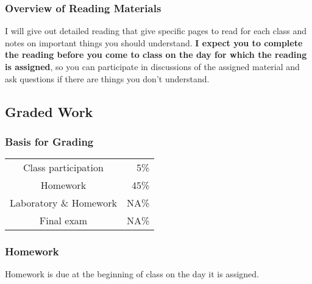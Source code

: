 \documentclass[11pt,twoside]{jgsyllabus}\usepackage[]{graphicx}\usepackage[]{xcolor}
\begin{document}
\subsubsection{Overview of Reading Materials}
I will give out detailed reading that give specific pages to read for each
class and notes on important things you should understand.
\textbf{I expect you to complete the reading before you come to class
on the day for which the reading is assigned},
so you can participate in discussions of the assigned material and ask
questions if there are things you don't understand.  %

\subsection{Graded Work}
%
%
%
\subsubsection[Grading]{Basis for Grading}

\begin{center}
	\begin{tabular}[t]{cr}
		Class participation & 5\%\\
		Homework & 45\%\\
		Laboratory \& Homework & NA\%\\
		Final exam   & NA\%\\
	\end{tabular}
\end{center}
%
\iffalse
\subsubsection[Participation]{Participation}
To make sure that people who are taking the course asynchronously have lots of
opportunity to participate in discussions, I will be putting discussion
questions on the Brightspace discussion board each week and you will get
participation credit for posting on the discussion boards and responding to
other students' posts. %

I am also setting up discussion boards for questions about the readings and
lectures and labs. I encourage you to ask on those boards about anything that
you didn't understand or thought was unclear, or would like to see me cover %
in greater detail in future classes.
\fi
%
%
%
\iftrue
\subsubsection{Homework}
Homework is due at the beginning of class on the day it is assigned.
\fi
\iftrue
\end{document}

